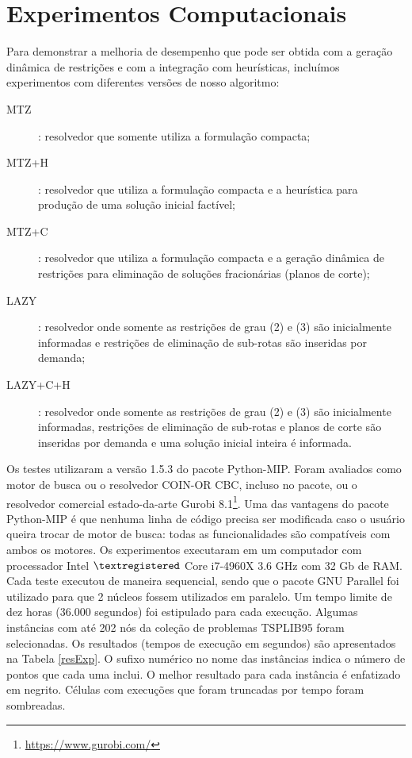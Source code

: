 \documentclass[a4paper,11pt,fleqn]{article}
\begin{document}
\section{Experimentos Computacionais} \label{secExp}

Para demonstrar a melhoria de desempenho que pode ser obtida com a geração
dinâmica de restrições e com a integração com heurísticas, incluímos
experimentos com diferentes versões de nosso algoritmo:

\begin{description}
	\item[\textsc{MTZ}]: resolvedor que somente utiliza a formulação compacta;
	\item[\textsc{MTZ+H}]: resolvedor que utiliza a formulação compacta e a heurística para produção de uma solução inicial factível;
	\item[\textsc{MTZ+C}]: resolvedor que utiliza a formulação compacta e a geração dinâmica de restrições para eliminação de soluções fracionárias (planos de corte);
	\item[\textsc{LAZY}]: resolvedor onde somente as restrições de grau (2) e (3) são inicialmente informadas e restrições de eliminação de sub-rotas são inseridas por demanda;
	\item[\textsc{LAZY+C+H}]: resolvedor onde somente as restrições de grau (2) e (3) são inicialmente informadas, restrições de eliminação de sub-rotas e planos de corte são inseridas por demanda e uma solução inicial inteira é informada.
\end{description}

Os testes utilizaram a versão 1.5.3 do pacote Python-MIP. Foram avaliados como motor de busca ou o resolvedor COIN-OR CBC, incluso no pacote, ou o resolvedor comercial estado-da-arte Gurobi 8.1\footnote{\url{https://www.gurobi.com/}}. Uma das vantagens do pacote Python-MIP é que nenhuma linha de código precisa ser modificada caso o usuário queira trocar de motor de busca: todas as funcionalidades são compatíveis com ambos os motores. Os experimentos executaram em um computador com processador Intel $\textregistered$ Core i7-4960X 3.6 GHz com 32 Gb de RAM. Cada teste executou de maneira sequencial, sendo que o pacote GNU Parallel \citep{Tange2011} foi utilizado para que 2 núcleos fossem utilizados em paralelo. Um tempo limite de dez horas (36.000 segundos) foi estipulado para cada execução. Algumas instâncias com até 202 nós da coleção de problemas TSPLIB95 \citep{Reinelt95} foram selecionadas. Os resultados (tempos de execução em segundos) são apresentados na Tabela \ref{resExp}. O sufixo numérico no nome das instâncias indica o número de pontos que cada uma inclui. O melhor resultado para cada instância é enfatizado em negrito. Células com execuções que foram truncadas por tempo foram sombreadas.
\end{document}
